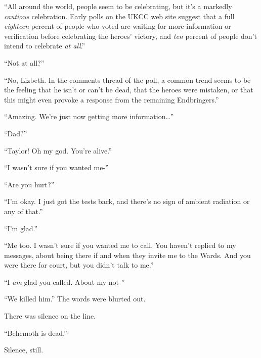 ``All around the world, people seem to be celebrating, but it's a markedly \emph{cautious} celebration.  Early polls on the UKCC web site suggest that a full \emph{eighteen} percent of people who voted are waiting for more information or verification before celebrating the heroes' victory, and \emph{ten} percent of people don't intend to celebrate \emph{at all}.''



``Not at all?''



``No, Lizbeth.  In the comments thread of the poll, a common trend seems to be the feeling that he isn't or can't be dead, that the heroes were mistaken, or that this might even provoke a response from the remaining Endbringers.''



``Amazing.  We're just now getting more information\ldots''



\sectionbreak



``Dad?''



``Taylor!  Oh my god.  You're alive.''



``I wasn't sure if you wanted me-''



``Are you hurt?''



``I'm okay.  I just got the tests back, and there's no sign of ambient radiation or any of that.''



``I'm glad.''



``Me too.  I wasn't sure if you wanted me to call.  You haven't replied to my messages, about being there if and when they invite me to the Wards.  And you were there for court, but you didn't talk to me.''



``I \emph{am} glad you called.  About my not-''



``We killed him.''  The words were blurted out.



There was silence on the line.



``Behemoth is dead.''



Silence, still.



